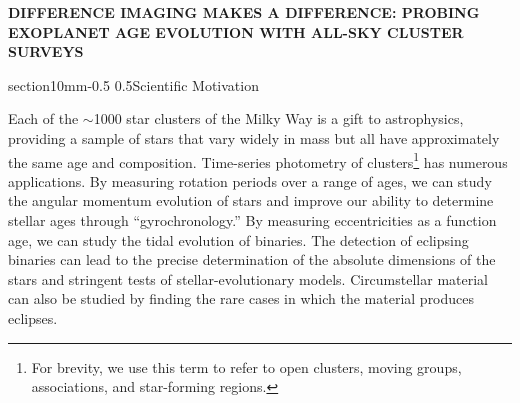 \documentclass[letterpaper,11pt]{article}
\makeatletter
\renewcommand\section{\@startsection%
{section}{1}{0mm}{-0.5\baselineskip}%
{0.5\baselineskip}{\normalfont\normalsize\bfseries}}%
\makeatother
\begin{document}
\pagestyle{plain}


 

\begin{center} 
\bfseries\uppercase{
  Difference Imaging Makes A Difference: Probing Exoplanet Age Evolution With 
All-Sky Cluster Surveys  
}
\end{center}





\vspace{-4mm}






\section{Scientific Motivation}

\vspace{-0.3mm}
Each of the $\sim$1000 star clusters of the Milky Way is a gift to
astrophysics, providing a sample of stars that vary widely in mass
but all have approximately the same age and composition.  Time-series
photometry of clusters\footnote{For brevity, we use this term to refer
  to open clusters, moving groups, associations, and star-forming
  regions.} has numerous applications.  By measuring rotation periods
over a range of ages, we can study the angular momentum evolution of
stars and improve our ability to determine stellar ages through
``gyrochronology.'' By measuring eccentricities as a function age, we
can study the tidal evolution of binaries. The detection of eclipsing
binaries can lead to the precise determination of the absolute
dimensions of the stars and stringent tests of stellar-evolutionary
models.  Circumstellar material can also be studied by finding the
rare cases in which the material produces eclipses.
\end{document}
